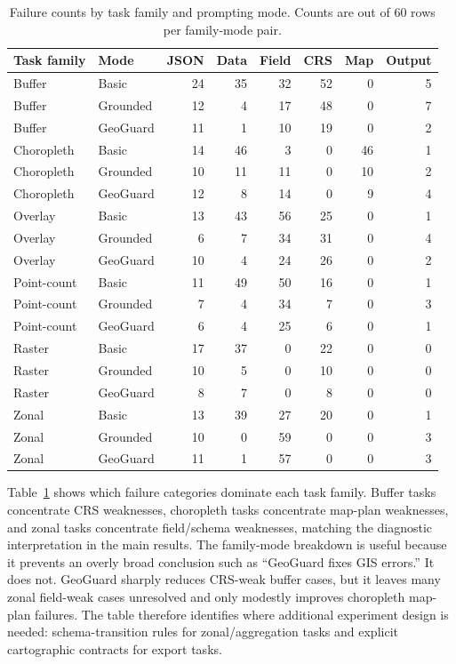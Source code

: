 \documentclass[12pt]{gsis}  %
\begin{document}
\begin{table}[htbp]
\centering
\caption{Failure counts by task family and prompting mode. Counts are out of 60 rows per family-mode pair.}
\label{tab:failure-family-full}
\small
\setlength{\tabcolsep}{3pt}
\begin{tabular}{llrrrrrr}
\toprule
Task family & Mode & JSON & Data & Field & CRS & Map & Output \\
\midrule
Buffer & Basic & 24 & 35 & 32 & 52 & 0 & 5 \\
Buffer & Grounded & 12 & 4 & 17 & 48 & 0 & 7 \\
Buffer & GeoGuard & 11 & 1 & 10 & 19 & 0 & 2 \\
Choropleth & Basic & 14 & 46 & 3 & 0 & 46 & 1 \\
Choropleth & Grounded & 10 & 11 & 11 & 0 & 10 & 2 \\
Choropleth & GeoGuard & 12 & 8 & 14 & 0 & 9 & 4 \\
Overlay & Basic & 13 & 43 & 56 & 25 & 0 & 1 \\
Overlay & Grounded & 6 & 7 & 34 & 31 & 0 & 4 \\
Overlay & GeoGuard & 10 & 4 & 24 & 26 & 0 & 2 \\
Point-count & Basic & 11 & 49 & 50 & 16 & 0 & 1 \\
Point-count & Grounded & 7 & 4 & 34 & 7 & 0 & 3 \\
Point-count & GeoGuard & 6 & 4 & 25 & 6 & 0 & 1 \\
Raster & Basic & 17 & 37 & 0 & 22 & 0 & 0 \\
Raster & Grounded & 10 & 5 & 0 & 10 & 0 & 0 \\
Raster & GeoGuard & 8 & 7 & 0 & 8 & 0 & 0 \\
Zonal & Basic & 13 & 39 & 27 & 20 & 0 & 1 \\
Zonal & Grounded & 10 & 0 & 59 & 0 & 0 & 3 \\
Zonal & GeoGuard & 11 & 1 & 57 & 0 & 0 & 3 \\
\bottomrule
\end{tabular}
\end{table}

Table~\ref{tab:failure-family-full} shows which failure categories dominate each task family. Buffer tasks concentrate CRS weaknesses, choropleth tasks concentrate map-plan weaknesses, and zonal tasks concentrate field/schema weaknesses, matching the diagnostic interpretation in the main results. The family-mode breakdown is useful because it prevents an overly broad conclusion such as ``GeoGuard fixes GIS errors.'' It does not. GeoGuard sharply reduces CRS-weak buffer cases, but it leaves many zonal field-weak cases unresolved and only modestly improves choropleth map-plan failures. The table therefore identifies where additional experiment design is needed: schema-transition rules for zonal/aggregation tasks and explicit cartographic contracts for export tasks.
\end{document}
